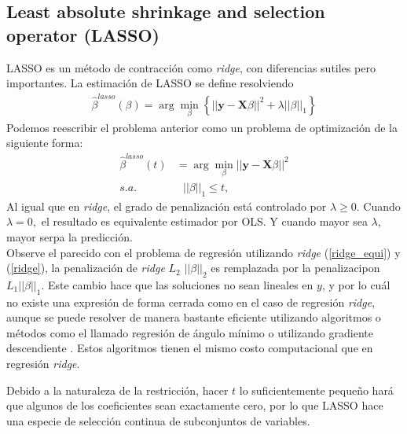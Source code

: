 \documentclass{article}
\newcommand{\X}{\mathbf{X}}
\newcommand{\y}{\mathbf{y}}
\begin{document}
\subsection{Least absolute shrinkage and selection operator (LASSO)}
LASSO es un método de contracción como \textit{ridge}, con diferencias sutiles pero importantes. La estimación de LASSO se define resolviendo \citep{lasso_original}
\begin{align} \label{lasso_equation}
\hat{\beta}^{lasso}(\beta) = \arg \min_{\beta} \left\{||\y- \X \beta||^2+\lambda||\beta||_1 \right\}
\end{align}
Podemos reescribir el problema anterior como un problema de optimización de la siguiente forma:
\begin{align}\label{lasso_equation_opti}
    \hat{\beta}^{lasso}(t) &= \arg \min_{\beta} ||\y-\X\beta||^2\\
    s.a.&\ \ \  ||\beta||_1\leq t,
\end{align}
Al igual que en \textit{ridge}, el grado de penalización está controlado por $\lambda\geq 0.$ Cuando $\lambda=0,$ el resultado es equivalente estimador por OLS. Y cuando mayor sea $\lambda$, mayor serpa la predicción.\\

Observe el parecido con el problema de regresión utilizando \textit{ridge} (\ref{ridge_equi}) y (\ref{ridge}), la penalización de \textit{ridge} $L_2$ $||\beta||_2$ es remplazada por la penalizacipon $L_1 ||\beta||_1.$ Este cambio hace que las soluciones no sean lineales en $y$, y por lo cuál no existe una expresión de forma cerrada como en el caso de regresión \textit{ridge}, aunque se puede resolver de manera bastante eficiente utilizando algoritmos o métodos como el llamado regresión de ángulo mínimo \citep{lars_efron} o utilizando gradiente descendiente \citep{statisticallearning}. Estos algoritmos tienen el mismo costo computacional que en regresión \textit{ridge}. \citep{statisticallearning}

Debido a la naturaleza de la restricción, hacer $t$ lo suficientemente pequeño hará que algunos de los coeficientes sean exactamente cero, por lo que LASSO hace una especie de selección continua de subconjuntos de variables. 
\end{document}
